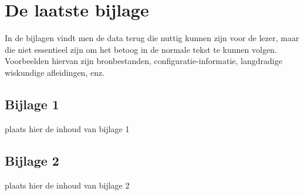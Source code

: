 \chapter{De laatste bijlage}
\label{app:n}
In de bijlagen vindt men de data terug die nuttig kunnen zijn voor de
lezer, maar die niet essentieel zijn om het betoog in de normale tekst te
kunnen volgen. Voorbeelden hiervan zijn bronbestanden,
configuratie-informatie, langdradige wiskundige afleidingen, enz.

\section{Bijlage 1}

	\par plaats hier de inhoud van bijlage 1

\section{Bijlage 2}

	\par plaats hier de inhoud van bijlage 2